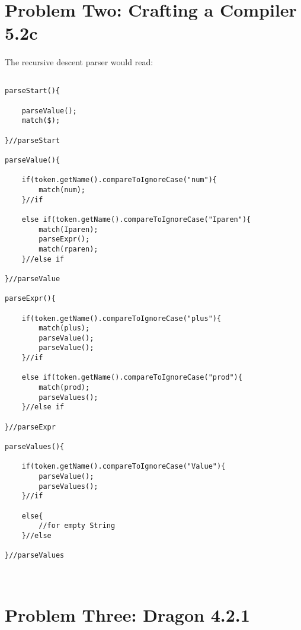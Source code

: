 \documentclass[letterpaper, 10pt,DIV=13]{scrartcl}
\numberwithin{equation}{section} %
\numberwithin{figure}{section} %
\numberwithin{table}{section} %
\begin{document}
\section{Problem Two: Crafting a Compiler 5.2c}

\paragraph{} The recursive descent parser would read:


\lstset{numbers=left, numberstyle=\tiny, stepnumber=1, numbersep=5pt, basicstyle=\footnotesize\ttfamily}
\begin{lstlisting}[frame=single, ] 

parseStart(){

    parseValue();
    match($);

}//parseStart

parseValue(){

    if(token.getName().compareToIgnoreCase("num"){
        match(num);
    }//if
    
    else if(token.getName().compareToIgnoreCase("Iparen"){
        match(Iparen);
        parseExpr();
        match(rparen);
    }//else if
    
}//parseValue

parseExpr(){

    if(token.getName().compareToIgnoreCase("plus"){
        match(plus);
        parseValue();
        parseValue();
    }//if
    
    else if(token.getName().compareToIgnoreCase("prod"){
        match(prod);
        parseValues();
    }//else if
    
}//parseExpr

parseValues(){

    if(token.getName().compareToIgnoreCase("Value"){
        parseValue();
        parseValues();
    }//if
    
    else{
        //for empty String
    }//else 
    
}//parseValues



\end{lstlisting}



\newpage

\section{Problem Three: Dragon 4.2.1}
\end{document}
